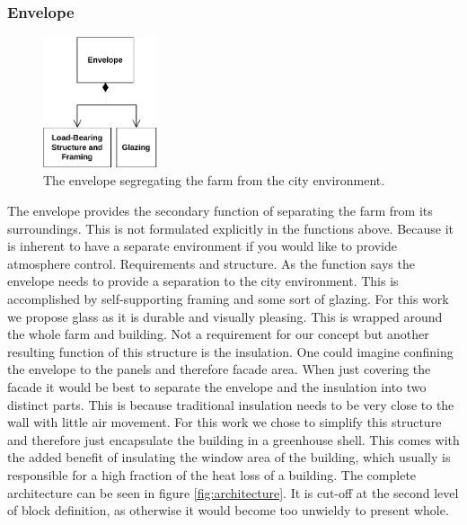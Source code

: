 \subsubsection{Envelope}
\begin{figure}
	\caption{The envelope segregating the farm from the city environment.}
	\label{wfig:envelope}
	\includegraphics[width=0.3\textwidth]{img/architecture/envelope.pdf}
\end{figure} 
The envelope provides the secondary function of separating the farm from its surroundings.
This is not formulated explicitly in the functions above.
Because it is inherent to have a separate environment if you would like to provide atmosphere control.
Requirements and structure.
As the function says the envelope needs to provide a separation to the city environment.
This is accomplished by self-supporting framing and some sort of glazing.
For this work we propose glass as it is durable and visually pleasing.
This is wrapped around the whole farm and building.
Not a requirement for our concept but another resulting function of this structure is the insulation.
One could imagine confining the envelope to the panels and therefore facade area.
When just covering the facade it would be best to separate the envelope and the insulation into two distinct parts.
This is because traditional insulation needs to be very close to the wall with little air movement.
For this work we chose to simplify this structure and therefore just encapsulate the building in a greenhouse shell.
This comes with the added benefit of insulating the window area of the building, which usually is responsible for a high fraction of the heat loss of a building.
The complete architecture can be seen in figure \ref{fig:architecture}.
It is cut-off at the second level of block definition, as otherwise it would become too unwieldy to present whole.

